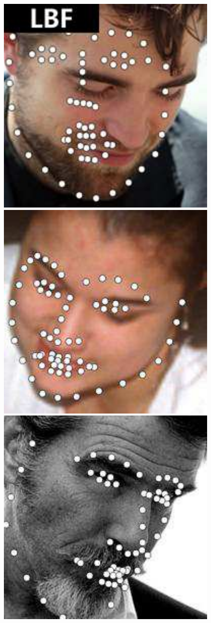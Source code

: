 \documentclass[journal]{IEEEtran}
\begin{document}
\begin{figure}[!htb]
\includegraphics[scale=0.22]{68_LBF_image_046}
\includegraphics[scale=0.22]{68_LBF_image_081}
\includegraphics[scale=0.22]{68_LBF_image_044}

\end{figure}
\end{document}
